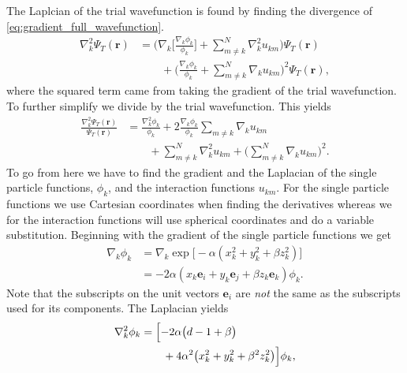 \documentclass[
    a4paper, aps, twocolumn, floatfix, superscriptaddress, nofootinbib]{revtex4-1}
\newcommand{\vf}{\mathbf}
\newcommand{\1}{\mathds{1}}
\begin{document}
    The Laplcian of the trial wavefunction is found by finding the divergence of
    \autoref{eq:gradient_full_wavefunction}.
    \begin{align}
        \nabla_k^2\Psi_T(\vf{r})
        &=
        \Biggl(
            \nabla_k\Biggl[
                \frac{\nabla_k\phi_k}{\phi_k}
            \Biggr]
            +
            \sum_{m \neq k}^N \nabla_k^2 u_{km}
        \Biggr)\Psi_T(\vf{r})
        \\
        &\qquad
        +
        \Biggl(
            \frac{\nabla_k\phi_k}{\phi_k}
            + \sum_{m \neq k}^N
            \nabla_k u_{km}
        \Biggr)^2
        \Psi_T(\vf{r}),
    \end{align}
    where the squared term came from taking the gradient of the trial
    wavefunction.  To further simplify we divide by the trial
    wavefunction. This yields
    \begin{align}
        \frac{\nabla_k^2\Psi_T(\vf{r})}{\Psi_T(\vf{r})}
        &=
        \frac{\nabla_k^2\phi_k}{\phi_k}
        + 2\frac{\nabla_k\phi_k}{\phi_k}
        \sum_{m \neq k}\nabla_k u_{km}
        \nonumber \\
        &\qquad
        + \sum_{m\neq k}^N\nabla_k^2 u_{km}
        + \Biggl(
            \sum_{m \neq k}^N\nabla_k u_{km}
        \Biggr)^2.
    \end{align}
    To go from here we have to find the gradient and the Laplacian of
    the single particle functions, $\phi_k$, and the interaction
    functions $u_{km}$. For the single particle functions we use
    Cartesian coordinates when finding the derivatives whereas we for
    the interaction functions will use spherical coordinates and do a
    variable substitution. Beginning with the gradient of the single
    particle functions we get
    \begin{align}
        \nabla_k\phi_k
        &=
        \nabla_k\exp\bigl[
            -\alpha(x_k^2 + y_k^2 + \beta z_k^2)
        \bigr] \\
        &=
        -2\alpha
        (x_k\vf{e}_i + y_k\vf{e}_j + \beta z_k\vf{e}_k)
        \phi_k.
    \end{align}
    Note that the subscripts on the unit vectors $\vf{e}_i$ are
    \textit{not} the same as the subscripts used for its components. The
    Laplacian yields
    \begin{align}
        \nabla_k^2\phi_k
        &=
        \Bigl[
            -2\alpha
            \big(
                d - 1 + \beta
            \bigr)
            \nonumber \\
            &\qquad
            + 4\alpha^2
            \bigl(
                x_k^2 + y_k^2 + \beta^2z_k^2
            \bigr)
        \Bigr]
        \phi_k,
    \end{align}
\end{document}
